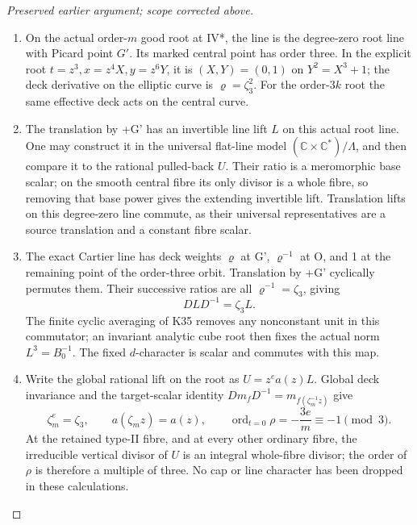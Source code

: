 \begin{proof}[Preserved earlier argument; scope corrected above]
\begin{enumerate}[label=\arabic*.]
\par\medskip\noindent\textbf{2. Actual cap root lift and its character.}\enspace

\item On the actual order-\(m\) good root at IV*, the line is the degree-zero
root line with Picard point \(G'\). Its marked central point has order
three. In the explicit root \(t=z^3,x=z^4X,y=z^6Y\), it is
\((X,Y)=(0,1)\) on \(Y^2=X^3+1\); the deck derivative on the
elliptic curve is \(\varrho=\zeta_3^2\). For the order-\(3k\)
root the same effective deck acts on the central curve.

\item The translation by +G' has an invertible line lift \(L\) on this actual
root line. One may construct it in the universal flat-line model
\((\mathbb C\times\mathbb C^*)/\Lambda\), and then compare it to
the rational pulled-back \(U\). Their ratio is a meromorphic base scalar;
on the smooth central fibre its only divisor is a whole fibre, so removing
that base power gives the extending invertible lift. Translation lifts on
this degree-zero line commute, as their universal representatives are a
source translation and a constant fibre scalar.

\item The exact Cartier line has deck weights \(\varrho\) at G',
\(\varrho^{-1}\) at O, and 1 at the remaining point of the order-three
orbit. Translation by +G' cyclically permutes them. Their successive ratios
are all \(\varrho^{-1}=\zeta_3\), giving
\[
 DLD^{-1}=\zeta_3 L.                                             \tag{P3K.37.6}
\]
The finite cyclic averaging of K35 removes any nonconstant unit in this
commutator; an invariant analytic cube root then fixes the actual norm
\(L^3=B_0^{-1}\). The fixed \(d\)-character is scalar and commutes
with this map.

\item Write the global rational lift on the root as
\(U=z^e a(z)L\). Global deck invariance and the target-scalar identity
\(D m_f D^{-1}=m_{f(\zeta_m^{-1}z)}\) give
\[
 \zeta_m^e=\zeta_3,\qquad a(\zeta_mz)=a(z),\qquad
 \operatorname{ord}_{t=0}\rho=-\frac{3e}{m}\equiv-1\pmod3.
                                                                    \tag{P3K.37.7}
\]
At the retained type-II fibre, and at every other ordinary fibre, the
irreducible vertical divisor of \(U\) is an integral whole-fibre divisor;
the order of \(\rho\) is therefore a multiple of three. No cap or line
character has been dropped in these calculations.


\end{enumerate}
\end{proof}
